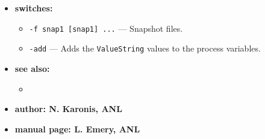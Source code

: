 \begin{itemize}
%
\item {\bf switches:}
%
%
    \begin{itemize}
%
%
        \item {\tt -f snap1 [snap1] ...} --- Snapshot files.
        \item {\tt -add} --- Adds the {\tt ValueString} values to the process variables.
    \end{itemize}

\item {\bf see also:}
    \begin{itemize}
%
%
    \item {}
    \end{itemize}
%
%
\item {\bf author: N. Karonis, ANL} 
\item {\bf manual page: L. Emery, ANL} 
\end{itemize}
